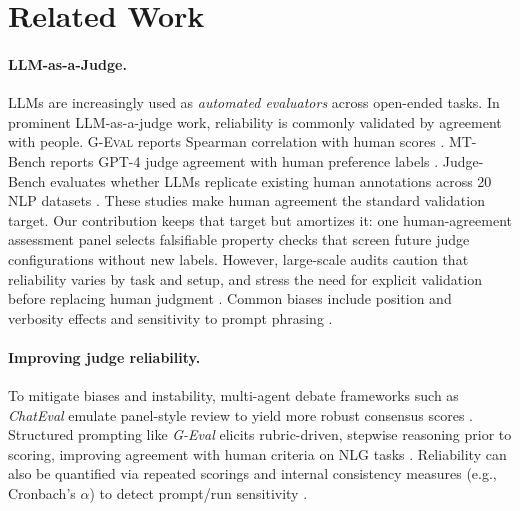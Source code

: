 \documentclass{article}
\begin{document}
\section{Related Work}
\paragraph{LLM-as-a-Judge.}
LLMs are increasingly used as \emph{automated evaluators} across open-ended tasks.
In prominent LLM-as-a-judge work, reliability is commonly validated by agreement with people.
\textsc{G-Eval} reports Spearman correlation with human scores \citep{Liu2023GEval}.
MT-Bench reports GPT-4 judge agreement with human preference labels \citep{Zheng2023MTBench}.
Judge-Bench evaluates whether LLMs replicate existing human annotations across 20 NLP datasets \citep{Kocmi2024HumanVsLLM}.
These studies make human agreement the standard validation target.
Our contribution keeps that target but amortizes it: one human-agreement assessment panel selects falsifiable property checks that screen future judge configurations without new labels.
However, large-scale audits caution that reliability varies by task and setup, and stress the need for explicit validation before replacing human judgment \citep{Kocmi2024HumanVsLLM,Li2024TrustLLMJudgments}.
Common biases include position and verbosity effects and sensitivity to prompt phrasing \citep{Zheng2023MTBench,Li2024TrustLLMJudgments}.

\paragraph{Improving judge reliability.}
To mitigate biases and instability, multi-agent debate frameworks such as \emph{ChatEval} emulate panel-style review to yield more robust consensus scores \citep{Chan2024ChatEval}. Structured prompting like \emph{G-Eval} elicits rubric-driven, stepwise reasoning prior to scoring, improving agreement with human criteria on NLG tasks \citep{Liu2023GEval}. Reliability can also be quantified via repeated scorings and internal consistency measures (e.g., Cronbach’s $\alpha$) to detect prompt/run sensitivity \citep{Li2024TrustLLMJudgments}.
\end{document}
